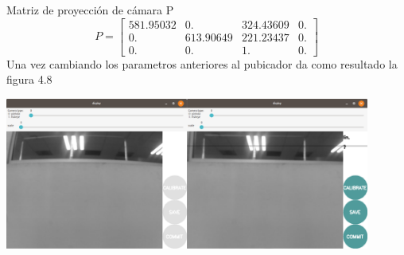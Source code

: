 Matriz de proyección de cámara P
\begin{equation}
	P=
	\begin{bmatrix}
		581.95032 & 0.        & 324.43609 & 0. \\
		0.        & 613.90649 & 221.23437 & 0. \\
		0.        & 0.        & 1.        & 0.
	\end{bmatrix}
\end{equation}
Una vez cambiando los parametros anteriores al pubicador da como resultado la figura 4.8
\begin{center}
	\includegraphics[width=0.9\textwidth]{Contenido/Cuerpo/Capitulo4/Fig10.eps}
	\label{Fig1}
\end{center}



